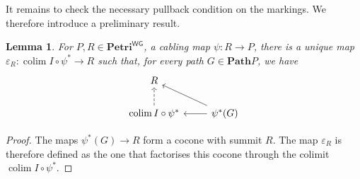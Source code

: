 \documentclass[11pt,a4paper]{article}
\theoremstyle{plain}
\newtheorem{lemma}[theorem]{Lemma}
\theoremstyle{definition}
\theoremstyle{remark}
\newcommand{\WGPetri}{\mathbf{Petri}^{\mathsf{WG}}}
\newcommand{\Colim}{\colim}
\DeclareMathOperator*{\colim}{colim}
\newcommand{\Path}{\mathbf{Path}}
\begin{document}
It remains to check the necessary pullback condition on the markings. We therefore introduce a preliminary result.
\begin{lemma}
    For $P, R \in \WGPetri$, a cabling map $\psi : R \rightarrow P$, there is a unique map $\varepsilon_R : \Colim I \circ \psi^* \rightarrow R$ such that, for every path $G \in \Path{P}$, we have
 \[\begin{tikzcd}
	R & \\
	{\Colim I \circ \psi^*} & {\psi^*(G)}
	\arrow[dashed, from=2-1, to=1-1]
	\arrow[from=2-2, to=1-1]
	\arrow[from=2-2, to=2-1]
\end{tikzcd}\]
\end{lemma}
\begin{proof}
The maps $\psi^*(G) \rightarrow R$ form a cocone with summit $R$. The map $\varepsilon_R$ is therefore defined as the one that factorises this cocone through the colimit $\Colim I \circ \psi^*$.
\end{proof}
\end{document}
